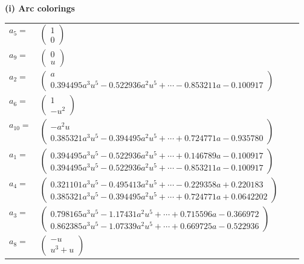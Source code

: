 \documentclass[1p]{elsarticle_modified}
\theoremstyle{definition}
\begin{document}
\flushleft \textbf{(i) Arc colorings}\\
\begin{tabular}{m{7pt} m{180pt} m{7pt} m{180pt} }
\flushright $a_{5}=$&$\begin{pmatrix}1\\0\end{pmatrix}$ \\
\flushright $a_{9}=$&$\begin{pmatrix}0\\u\end{pmatrix}$ \\
\flushright $a_{2}=$&$\begin{pmatrix}a\\0.394495 a^{3} u^{5}-0.522936 a^{2} u^{5}+\cdots-0.853211 a-0.100917\end{pmatrix}$ \\
\flushright $a_{6}=$&$\begin{pmatrix}1\\- u^2\end{pmatrix}$ \\
\flushright $a_{10}=$&$\begin{pmatrix}- a^2 u\\0.385321 a^{3} u^{5}-0.394495 a^{2} u^{5}+\cdots+0.724771 a-0.935780\end{pmatrix}$ \\
\flushright $a_{1}=$&$\begin{pmatrix}0.394495 a^{3} u^{5}-0.522936 a^{2} u^{5}+\cdots+0.146789 a-0.100917\\0.394495 a^{3} u^{5}-0.522936 a^{2} u^{5}+\cdots-0.853211 a-0.100917\end{pmatrix}$ \\
\flushright $a_{4}=$&$\begin{pmatrix}0.321101 a^{3} u^{5}-0.495413 a^{2} u^{5}+\cdots-0.229358 a+0.220183\\0.385321 a^{3} u^{5}-0.394495 a^{2} u^{5}+\cdots+0.724771 a+0.0642202\end{pmatrix}$ \\
\flushright $a_{3}=$&$\begin{pmatrix}0.798165 a^{3} u^{5}-1.17431 a^{2} u^{5}+\cdots+0.715596 a-0.366972\\0.862385 a^{3} u^{5}-1.07339 a^{2} u^{5}+\cdots+0.669725 a-0.522936\end{pmatrix}$ \\
\flushright $a_{8}=$&$\begin{pmatrix}- u\\u^3+u\end{pmatrix}$ \\

\end{tabular}
\end{document}
